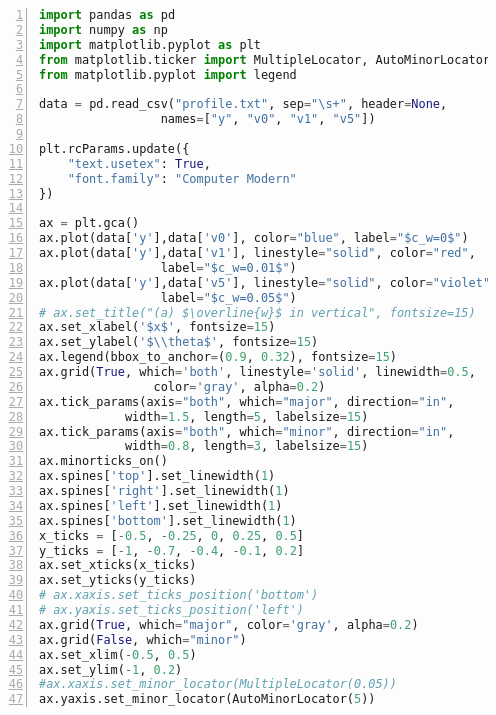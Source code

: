 \begin{lstlisting}[numbers=left,frame=single,language=Python]
import pandas as pd
import numpy as np
import matplotlib.pyplot as plt
from matplotlib.ticker import MultipleLocator, AutoMinorLocator
from matplotlib.pyplot import legend

data = pd.read_csv("profile.txt", sep="\s+", header=None,
				 names=["y", "v0", "v1", "v5"])

plt.rcParams.update({
	"text.usetex": True,
	"font.family": "Computer Modern"
})

ax = plt.gca()
ax.plot(data['y'],data['v0'], color="blue", label="$c_w=0$")
ax.plot(data['y'],data['v1'], linestyle="solid", color="red",
				 label="$c_w=0.01$")
ax.plot(data['y'],data['v5'], linestyle="solid", color="violet",
				 label="$c_w=0.05$")
# ax.set_title("(a) $\overline{w}$ in vertical", fontsize=15)
ax.set_xlabel('$x$', fontsize=15)
ax.set_ylabel('$\\theta$', fontsize=15)
ax.legend(bbox_to_anchor=(0.9, 0.32), fontsize=15)
ax.grid(True, which='both', linestyle='solid', linewidth=0.5, 
				color='gray', alpha=0.2)
ax.tick_params(axis="both", which="major", direction="in", 
			width=1.5, length=5, labelsize=15)
ax.tick_params(axis="both", which="minor", direction="in", 
			width=0.8, length=3, labelsize=15)
ax.minorticks_on()
ax.spines['top'].set_linewidth(1)
ax.spines['right'].set_linewidth(1)
ax.spines['left'].set_linewidth(1)
ax.spines['bottom'].set_linewidth(1)
x_ticks = [-0.5, -0.25, 0, 0.25, 0.5]
y_ticks = [-1, -0.7, -0.4, -0.1, 0.2]
ax.set_xticks(x_ticks)
ax.set_yticks(y_ticks)
# ax.xaxis.set_ticks_position('bottom')
# ax.yaxis.set_ticks_position('left')
ax.grid(True, which="major", color='gray', alpha=0.2)
ax.grid(False, which="minor")
ax.set_xlim(-0.5, 0.5)
ax.set_ylim(-1, 0.2)
#ax.xaxis.set_minor_locator(MultipleLocator(0.05))
ax.yaxis.set_minor_locator(AutoMinorLocator(5))
\end{lstlisting}
\par
\noindent
